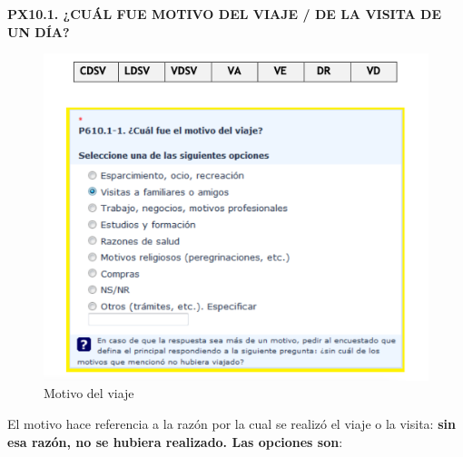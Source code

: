 \documentclass[
  openany]{book}
\begin{document}
\textbf{PX10.1. ¿CUÁL FUE MOTIVO DEL VIAJE / DE LA VISITA DE UN DÍA?}

\begin{figure}

{\centering \includegraphics[width=1\linewidth]{imagenes/figura6-100} 

}

\caption{Motivo del viaje}\label{fig:motiv987}
\end{figure}

El motivo hace referencia a la razón por la cual se realizó el viaje o la visita: \textbf{sin esa razón, no se hubiera realizado. Las opciones son}:
\end{document}
